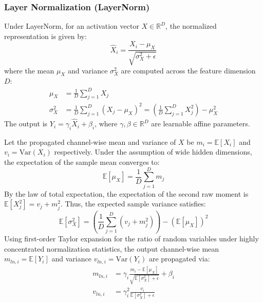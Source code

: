 \documentclass{article}
\theoremstyle{plain}
\theoremstyle{definition}
\theoremstyle{remark}
\begin{document}
\iffalse
\subsubsection{Layer Normalization (LayerNorm)}
Under LayerNorm, for an activation vector $X \in \mathbb{R}^D$, the normalized representation is given by:
\begin{equation}
    \hat{X}_i = \frac{X_i - \mu_X}{\sqrt{\sigma_X^2 + \epsilon}}
\end{equation}
where the mean $\mu_X$ and variance $\sigma_X^2$ are computed across the feature dimension $D$:
\begin{align}
    \mu_X &= \frac{1}{D} \sum_{j=1}^D X_j \\
    \sigma_X^2 &= \frac{1}{D} \sum_{j=1}^D (X_j - \mu_X)^2 = \left( \frac{1}{D} \sum_{j=1}^D X_j^2 \right) - \mu_X^2
\end{align}
The output is $Y_i = \gamma_i \hat{X}_i + \beta_i$, where $\gamma, \beta \in \mathbb{R}^D$ are learnable affine parameters. 

Let the propagated channel-wise mean and variance of $X$ be $m_i = \mathbb{E}[X_i]$ and $v_i = \text{Var}(X_i)$ respectively. Under the assumption of wide hidden dimensions, the expectation of the sample mean converges to:
\begin{equation}
    \mathbb{E}[\mu_X] = \frac{1}{D} \sum_{j=1}^D m_j
\end{equation}
By the law of total expectation, the expectation of the second raw moment is $\mathbb{E}[X_j^2] = v_j + m_j^2$. Thus, the expected sample variance satisfies:
\begin{equation}
    \mathbb{E}[\sigma_X^2] = \left( \frac{1}{D} \sum_{j=1}^D (v_j + m_j^2) \right) - (\mathbb{E}[\mu_X])^2
\end{equation}
Using first-order Taylor expansion for the ratio of random variables under highly concentrated normalization statistics, the output channel-wise mean $m_{ln, i} = \mathbb{E}[Y_i]$ and variance $v_{ln, i} = \text{Var}(Y_i)$ are propagated via:
\begin{align}
    m_{ln, i} &= \gamma_i \frac{m_i - \mathbb{E}[\mu_X]}{\sqrt{\mathbb{E}[\sigma_X^2] + \epsilon}} + \beta_i \\
    v_{ln, i} &= \gamma_i^2 \frac{v_i}{\mathbb{E}[\sigma_X^2] + \epsilon}
\end{align}
\end{document}
